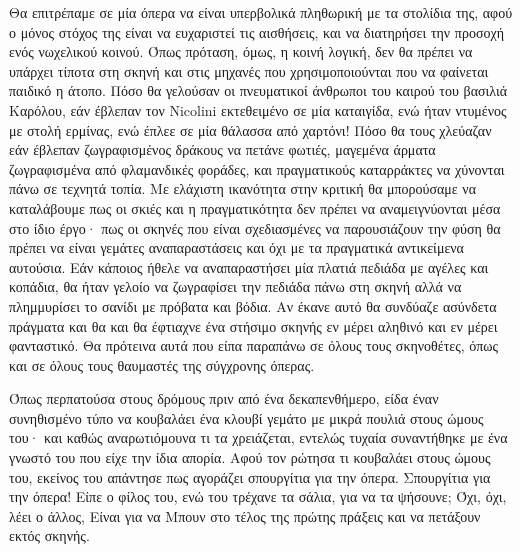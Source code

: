 \noindent
Θα επιτρέπαμε σε μία όπερα να είναι υπερβολικά πληθωρική με τα στολίδια της, αφού ο μόνος στόχος της είναι να ευχαριστεί τις αισθήσεις, και να διατηρήσει την προσοχή ενός νωχελικού κοινού. Όπως πρόταση, όμως, η κοινή λογική, δεν θα πρέπει να υπάρχει τίποτα στη σκηνή και στις μηχανές που χρησιμοποιούνται που να φαίνεται παιδικό η άτοπο. Πόσο θα γελούσαν οι πνευματικοί άνθρωποι του καιρού του βασιλιά Καρόλου, εάν έβλεπαν τον Nicolini εκτεθειμένο σε μία καταιγίδα, ενώ ήταν ντυμένος με στολή ερμίνας, ενώ έπλεε σε μία θάλασσα από χαρτόνι! Πόσο θα τους χλεύαζαν εάν έβλεπαν ζωγραφισμένος δράκους να πετάνε φωτιές, μαγεμένα άρματα ζωγραφισμένα από φλαμανδικές φοράδες, και πραγματικούς καταρράκτες να χύνονται πάνω σε τεχνητά τοπία. Με ελάχιστη ικανότητα στην κριτική θα μπορούσαμε να καταλάβουμε πως οι σκιές και η πραγματικότητα δεν πρέπει να αναμειγνύονται μέσα στο ίδιο έργο· πως οι σκηνές που είναι σχεδιασμένες να παρουσιάζουν την φύση θα πρέπει να είναι γεμάτες αναπαραστάσεις και όχι με τα πραγματικά αντικείμενα αυτούσια. Εάν κάποιος ήθελε να αναπαραστήσει μία πλατιά πεδιάδα με αγέλες και κοπάδια, θα ήταν γελοίο να ζωγραφίσει την πεδιάδα πάνω στη σκηνή αλλά να πλημμυρίσει το σανίδι με πρόβατα και βόδια. Αν έκανε αυτό θα συνδύαζε ασύνδετα πράγματα και θα και θα έφτιαχνε ένα στήσιμο σκηνής εν μέρει αληθινό και εν μέρει φανταστικό. Θα πρότεινα αυτά που είπα παραπάνω σε όλους τους σκηνοθέτες, όπως και σε όλους τους θαυμαστές της σύγχρονης όπερας.

Όπως περπατούσα στους δρόμους πριν από ένα δεκαπενθήμερο, είδα έναν συνηθισμένο τύπο να κουβαλάει ένα κλουβί γεμάτο με μικρά πουλιά στους ώμους του· και καθώς αναρωτιόμουνα τι τα χρειάζεται, εντελώς τυχαία συναντήθηκε με ένα γνωστό του που είχε την ίδια απορία. Αφού τον ρώτησα τι κουβαλάει στους ώμους του, εκείνος του απάντησε πως αγοράζει σπουργίτια για την όπερα. Σπουργίτια για την όπερα! Είπε ο φίλος του, ενώ του τρέχανε τα σάλια, για να τα ψήσουνε; Όχι, όχι, λέει ο άλλος, Είναι για να Μπουν στο τέλος της πρώτης πράξεις και να πετάξουν εκτός σκηνής.

